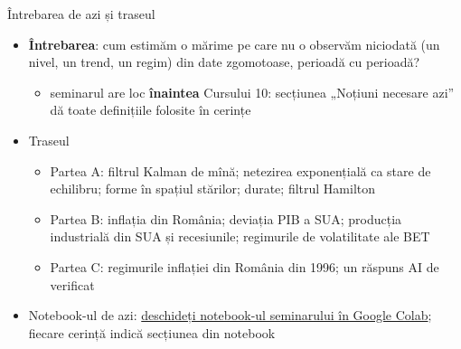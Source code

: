 \begin{frame}{Întrebarea de azi și traseul}
\itemsize{\small}
\begin{itemize}
    \item \textbf{Întrebarea}: cum estimăm o mărime pe care nu o observăm niciodată (un nivel, un trend, un regim) din date zgomotoase, perioadă cu perioadă?
    \begin{itemize}
        \item seminarul are loc \textbf{înaintea} Cursului 10: secțiunea „Noțiuni necesare azi” dă toate definițiile folosite în cerințe
    \end{itemize}
    \item Traseul
    \begin{itemize}
        \item Partea A: filtrul Kalman de mînă; netezirea exponențială ca stare de echilibru; forme în spațiul stărilor; durate; filtrul Hamilton
        \item Partea B: inflația din România; deviația PIB a SUA; producția industrială din SUA și recesiunile; regimurile de volatilitate ale BET
        \item Partea C: regimurile inflației din România din 1996; un răspuns AI de verificat
    \end{itemize}
    \item Notebook-ul de azi: \href{\nb}{deschideți notebook-ul seminarului în Google Colab}; fiecare cerință indică secțiunea din notebook
\end{itemize}
\end{frame}


